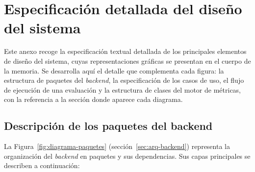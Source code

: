 \chapter{Especificación detallada del diseño del sistema}
\label{anx:diagramas}

Este anexo recoge la especificación textual detallada de los principales
elementos de diseño del sistema, cuyas representaciones gráficas se presentan en
el cuerpo de la memoria.  Se desarrolla aquí el detalle que complementa cada
figura: la estructura de paquetes del \emph{backend}, la especificación de los
casos de uso, el flujo de ejecución de una evaluación y la estructura de clases
del motor de métricas, con la referencia a la sección donde aparece cada
diagrama.

\section{Descripción de los paquetes del backend}

La Figura~\ref{fig:diagrama-paquetes} (sección~\ref{sec:arq-backend})
representa la organización del \emph{backend} en paquetes y sus dependencias.
Sus capas principales se describen a continuación:

